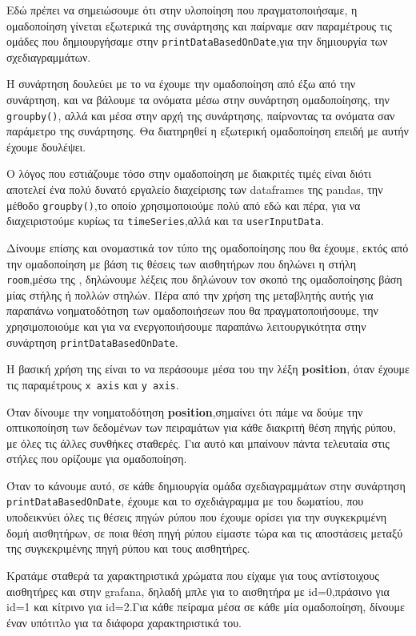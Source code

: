 Εδώ πρέπει να σημειώσουμε ότι στην υλοποίηση που πραγματοποιήσαμε, η ομαδοποίηση γίνεται εξωτερικά της συνάρτησης και παίρναμε σαν
παραμέτρους τις ομάδες που δημιουργήσαμε στην \texttt{printDataBasedOnDate},για την δημιουργία των σχεδιαγραμμάτων.

Η συνάρτηση δουλεύει με το να έχουμε την ομαδοποίηση από έξω από την συνάρτηση,
και να βάλουμε τα ονόματα μέσω στην συνάρτηση ομαδοποίησης, την \texttt{groupby()},
αλλά και μέσα στην αρχή της συνάρτησης, παίρνοντας τα ονόματα σαν παράμετρο της συνάρτησης.
Θα διατηρηθεί η εξωτερική ομαδοποίηση επειδή με αυτήν έχουμε δουλέψει.

Ο λόγος που εστιάζουμε τόσο στην ομαδοποίηση με διακριτές τιμές είναι διότι αποτελεί ένα πολύ
δυνατό εργαλείο διαχείρισης των dataframes της pandas, 
την μέθοδο \texttt{groupby()},το οποίο χρησιμοποιούμε πολύ από εδώ και πέρα,
για να διαχειριστούμε  κυρίως τα \texttt{timeSeries},αλλά και τα \texttt{userInputData}.

Δίνουμε επίσης και ονομαστικά τον τύπο της ομαδοποίησης που θα έχουμε, εκτός από την ομαδοποίηση με βάση τις θέσεις
των αισθητήρων που δηλώνει η στήλη \texttt{room},μέσω της \texttt{},
δηλώνουμε λέξεις που δηλώνουν τον σκοπό της ομαδοποίησης βάση μίας στήλης ή πολλών στηλών.
Πέρα από την χρήση της μεταβλητής αυτής για παραπάνω νοηματοδότηση των ομαδοποιήσεων που θα πραγματοποιήσουμε,
την χρησιμοποιούμε και για να ενεργοποιήσουμε παραπάνω λειτουργικότητα στην συνάρτηση \texttt{printDataBasedOnDate}.

Η βασική χρήση της \texttt{} είναι το να περάσουμε μέσα του την λέξη \textbf{position},
όταν έχουμε τις παραμέτρους \texttt{x axis} και \texttt{y axis}.

Όταν δίνουμε την νοηματοδότηση \textbf{position},σημαίνει ότι πάμε να δούμε την οπτικοποίηση των δεδομένων των πειραμάτων
για κάθε διακριτή θέση πηγής ρύπου, με όλες τις άλλες συνθήκες σταθερές.
Για αυτό και μπαίνουν πάντα τελευταία στις στήλες που ορίζουμε για ομαδοποίηση.

Όταν το κάνουμε αυτό, σε κάθε δημιουργία ομάδα σχεδιαγραμμάτων στην συνάρτηση \texttt{printDataBasedOnDate},
έχουμε και το σχεδιάγραμμα με του δωματίου, που υποδεικνύει όλες τις θέσεις πηγών ρύπου που έχουμε ορίσει για την συγκεκριμένη δομή αισθητήρων,
σε ποια θέση πηγή ρύπου είμαστε τώρα και τις  αποστάσεις μεταξύ της συγκεκριμένης πηγή ρύπου και τους
αισθητήρες.

Κρατάμε σταθερά τα χαρακτηριστικά χρώματα που είχαμε για τους αντίστοιχους αισθητήρες και στην grafana, δηλαδή μπλε για το αισθητήρα
με id=0,πράσινο για id=1 και κίτρινο για id=2.Για κάθε πείραμα μέσα σε κάθε μία ομαδοποίηση, δίνουμε έναν υπότιτλο για τα διάφορα 
χαρακτηριστικά του.

